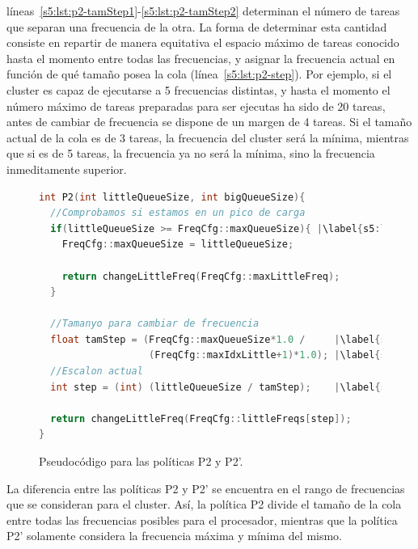 líneas~\ref{s5:lst:p2-tamStep1}-\ref{s5:lst:p2-tamStep2} determinan el
número de tareas que separan una frecuencia de la otra. La forma de
determinar esta cantidad consiste en repartir de manera equitativa el
espacio máximo de tareas conocido hasta el momento entre todas las
frecuencias, y asignar la frecuencia actual en función de qué tamaño posea
la cola (línea~\ref{s5:lst:p2-step}). Por ejemplo, si el cluster es capaz
de ejecutarse a 5 frecuencias distintas, y hasta el momento el número
máximo de tareas preparadas para ser ejecutas ha sido de 20 tareas, antes
de cambiar de frecuencia se dispone de un margen de 4 tareas. Si el tamaño
actual de la cola es de 3 tareas, la frecuencia del cluster será la mínima,
mientras que si es de 5 tareas, la frecuencia ya no será la mínima, sino la
frecuencia inmeditamente superior.

\begin{figure}
  \centering

  \begin{lstlisting}[language=C++]
int P2(int littleQueueSize, int bigQueueSize){      
  //Comprobamos si estamos en un pico de carga
  if(littleQueueSize >= FreqCfg::maxQueueSize){ |\label{s5:lst:p2-detectPico}|
    FreqCfg::maxQueueSize = littleQueueSize;

    return changeLittleFreq(FreqCfg::maxLittleFreq);
  }

  //Tamanyo para cambiar de frecuencia
  float tamStep = (FreqCfg::maxQueueSize*1.0 /     |\label{s5:lst:p2-tamStep1}|
                   (FreqCfg::maxIdxLittle+1)*1.0); |\label{s5:lst:p2-tamStep2}|
  //Escalon actual
  int step = (int) (littleQueueSize / tamStep);    |\label{s5:lst:p2-step}|

  return changeLittleFreq(FreqCfg::littleFreqs[step]);
}
  \end{lstlisting}

  \caption{Pseudocódigo para las políticas P2 y P2'.}

  \label{s5:fig:listing-p2}
\end{figure}

La diferencia entre las políticas P2 y P2' se encuentra en el rango de
frecuencias que se consideran para el cluster. Así, la política P2 divide
el tamaño de la cola entre todas las frecuencias posibles para el
procesador, mientras que la política P2' solamente considera la frecuencia
máxima y mínima del mismo. 


